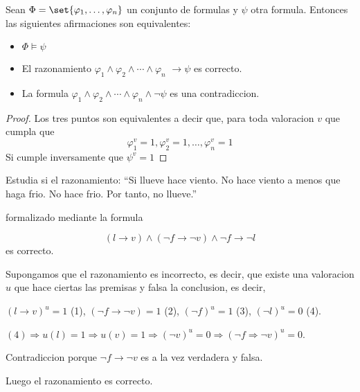 \begin{proposition}
	Sean \(\Phi = \set{\varphi_1, \ldots, \varphi_n }\) un conjunto de formulas y \(\psi \) otra formula. Entonces las siguientes afirmaciones son equivalentes:
	\begin{itemize}
		\item \(\Phi \models \psi\)
		\item El razonamiento \(\varphi_1 \wedge \varphi_2 \wedge \cdots \wedge \varphi_n \) \(\rightarrow \psi \) es correcto.
		\item La formula \(\varphi_1 \wedge \varphi_2 \wedge \cdots \wedge \varphi_n \wedge \neg \psi \) es una contradiccion.
	\end{itemize}
\end{proposition}

\begin{proof}
	Los tres puntos son equivalentes a decir que, para toda valoracion \(v \) que cumpla que
	\[
		\varphi^{v}_1 = 1, \varphi^{v}_2 = 1, \ldots, \varphi^{v}_n = 1
	\]
	Si cumple inversamente que \(\psi^{v} = 1 \)
\end{proof}

\begin{example}
	Estudia si el razonamiento:
	``Si llueve hace viento. No hace viento a menos que haga frio. No hace frio. Por tanto, no llueve.''

	formalizado mediante la formula

	\[
		(l \rightarrow v) \wedge (\neg f \rightarrow \neg v) \wedge \neg f \rightarrow \neg l
	\]
	es correcto.

	Supongamos que el razonamiento es incorrecto, es decir, que existe una valoracion \(u \) que hace ciertas las premisas y falsa la conclusion, es decir,

	\((l \rightarrow v)^{u} = 1 \) (1), \((\neg f \rightarrow \neg v) = 1 \) (2), \((\neg f)^{u} = 1 \) (3), \((\neg l)^{u} = 0 \) (4).

	\((4) \Rightarrow u(l) = 1 \Rightarrow u(v) = 1 \Rightarrow (\neg v )^{u}  = 0 \Rightarrow (\neg f \Rightarrow \neg v)^{u} = 0 \).

	Contradiccion porque \(\neg f \rightarrow \neg v \) es a la vez verdadera y falsa.

	Luego el razonamiento es correcto.
\end{example}

